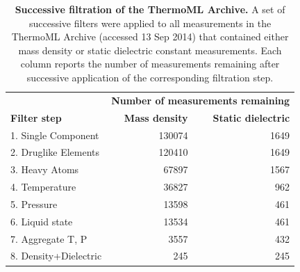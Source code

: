 \documentclass[aps,pre,twocolumn,nofootinbib,superscriptaddress,linenumbers]{revtex4-1}
\begin{document}


\begin{table}
\begin{tabular}{lrr}
\hline
 &  \multicolumn{2}{c}{\bf Number of measurements remaining} \\ \cline{2-3}
{\bf Filter step} &  {\bf Mass density} &  {\bf Static dielectric} \\ 
\hline
1.  Single Component   &               130074 &                                     1649 \\
2.  Druglike Elements  &               120410 &                                     1649 \\
3.  Heavy Atoms        &                67897 &                                     1567 \\
4.  Temperature        &                36827 &                                      962 \\
5.  Pressure           &                13598 &                                      461 \\
6.  Liquid state       &                13534 &                                      461 \\
7.  Aggregate T, P     &                 3557 &                                      432 \\
8.  Density+Dielectric &                  245 &                                      245 \\
\hline
\end{tabular}
\caption{{\bf Successive filtration of the ThermoML Archive.}
A set of successive filters were applied to all measurements in the ThermoML Archive (accessed 13 Sep 2014) that contained either mass density or static dielectric constant measurements.
Each column reports the number of measurements remaining after successive application of the corresponding filtration step.
}
\label{table:ThermoMLSummary}
\end{table}
\end{document}

